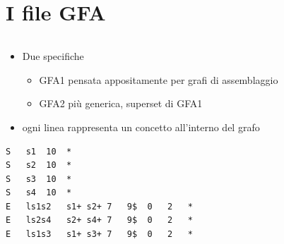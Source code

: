 \documentclass{beamer}
\begin{document}
 \section{I file GFA}
 \begin{frame}[fragile]{\secname}
 
 	\begin{columns}[onlytextwidth]
 		\begin{column}{\textwidth}
 			\begin{itemize}
				\item Due specifiche
					\begin{itemize}
							\item GFA1 pensata appositamente per grafi di assemblaggio
							\item GFA2 più generica, superset di GFA1
					\end{itemize}					
				\item ogni linea rappresenta un concetto
					all'interno del grafo
 			\end{itemize} 		
 		
 			\centering
 			\begin{lstlisting}[basicstyle=\ttfamily\scriptsize, frame=single]	
S	s1	10	*
S	s2	10	*
S	s3	10	*
S	s4	10	*
E	ls1s2	s1+	s2+	7	9$	0	2	*
E	ls2s4	s2+	s4+	7	9$	0	2	*
E	ls1s3	s1+	s3+	7	9$	0	2	*
			\end{lstlisting}
 		\end{column}
 		
 	\end{columns}
 \end{frame}
\end{document}
